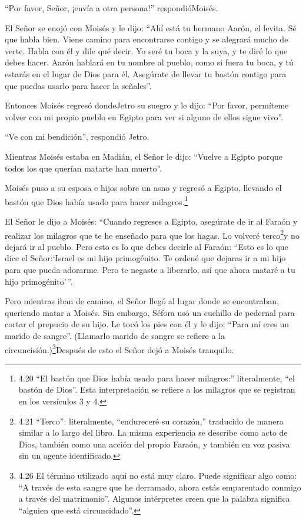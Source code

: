  ``Por favor, Señor, ¡envía a otra persona!''
respondióMoisés.

 El Señor se enojó con Moisés y le dijo: ``Ahí está tu
hermano Aarón, el levita. Sé que habla bien. Viene camino para
encontrarse contigo y se alegrará mucho de verte.  Habla
con él y dile qué decir. Yo seré tu boca y la suya, y te diré lo que
debes hacer.  Aarón hablará en tu nombre al pueblo, como si
fuera tu boca, y tú estarás en el lugar de Dios para él. 
Asegúrate de llevar tu bastón contigo para que puedas usarlo para hacer
la señales''.

 Entonces Moisés regresó dondeJetro su suegro y le dijo:
``Por favor, permíteme volver con mi propio pueblo en Egipto para ver si
alguno de ellos sigue vivo''.

``Ve con mi bendición'', respondió Jetro.

 Mientras Moisés estaba en Madián, el Señor le dijo:
``Vuelve a Egipto porque todos los que querían matarte han muerto''.

 Moisés puso a su esposa e hijos sobre un asno y regresó a
Egipto, llevando el bastón que Dios había usado para hacer
milagros.\footnote{4.20 ``El bastón que Dios había usado para hacer
  milagros:'' literalmente, ``el bastón de Dios''. Esta interpretación
  se refiere a los milagros que se registran en los versículos 3 y 4.}

 El Señor le dijo a Moisés: ``Cuando regreses a Egipto,
asegúrate de ir al Faraón y realizar los milagros que te he enseñado
para que los hagas. Lo volveré terco\footnote{4.21 ``Terco'':
  literalmente, ``endureceré su corazón,'' traducido de manera similar a
  lo largo del libro. La misma experiencia se describe como acto de
  Dios, también como una acción del propio Faraón, y también en voz
  pasiva sin un agente identificado.}y no dejará ir al pueblo.
 Pero esto es lo que debes decirle al Faraón: ``Esto es lo
que dice el Señor:`Israel es mi hijo primogénito.  Te
ordené que dejaras ir a mi hijo para que pueda adorarme. Pero te negaste
a liberarlo, así que ahora mataré a tu hijo primogénito'\,''.

 Pero mientras iban de camino, el Señor llegó al lugar
donde se encontraban, queriendo matar a Moisés.  Sin
embargo, Séfora usó un cuchillo de pedernal para cortar el prepucio de
su hijo. Le tocó los pies con él y le dijo: ``Para mí eres un marido de
sangre''.  (Llamarlo marido de sangre se refiere a la
circuncisión.)\footnote{4.26 El término utilizado aquí no está muy
  claro. Puede significar algo como: ``A través de esta sangre que he
  derramado, ahora estás emparentado conmigo a través del matrimonio''.
  Algunos intérpretes creen que la palabra significa ``alguien que está
  circuncidado''.}Después de esto el Señor dejó a Moisés tranquilo.

